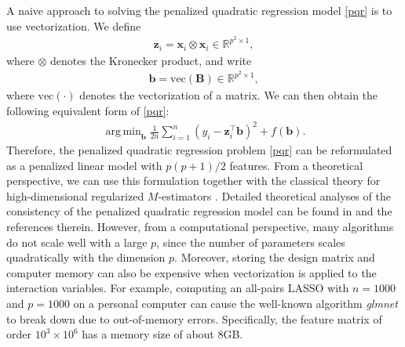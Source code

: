 \documentclass[preprint,authoryear,11pt]{elsarticle}
\def\mR{\mathbb{R}}
\def\wvec{\mbox{vec}}
\newcommand{\B}{\mathbf B}
\newcommand{\x}{\mathbf x}
\newcommand{\z}{\mathbf z}
\newcommand{\bb}{\mathbf b}
\newcommand{\trans}{^\top}
\DeclareMathOperator*{\argmin}{arg\,min} %
\begin{document}
 


A naive approach to solving the penalized quadratic regression model \eqref{pqr} is to use vectorization. We define
\begin{align*}
	\z_i=\x_i \otimes \x_i \in \mR^{p^2 \times 1},
\end{align*}
where \(\otimes\) denotes the Kronecker product, and write 
\begin{align*}
	\bb=\wvec(\B) \in \mR^{p^2 \times 1},
\end{align*}
where $\wvec(\cdot)$ denotes the vectorization of a matrix. We can then obtain  the following equivalent form of \eqref{pqr}:
\begin{align*}
\argmin_{ \bb } \frac{1}{2n} \sum_{i=1}^n (y_i-\z_i\trans \bb)^2+f(\bb).
\end{align*}
Therefore, the penalized quadratic regression problem \eqref{pqr} can be reformulated as a penalized linear model with $p(p+1)/2$ features. From a theoretical perspective, we can use this formulation together with the classical theory for high-dimensional regularized $M$-estimators \citep[Chapter 9]{wainwright2019high}. Detailed theoretical analyses of the consistency of the penalized quadratic regression model can be found in \cite{zhao2016analysis} and the references therein.
However, from a computational perspective, many algorithms do not scale well with a large $p$, since the number of parameters scales quadratically with the dimension $p$. Moreover, storing the design matrix and computer memory can also be expensive when vectorization is applied to the interaction variables. For example, computing an all-pairs LASSO with $n=1000$ and $p=1000$ on a personal computer can cause the well-known algorithm \textit{glmnet} \citep{glmnet} to break down due to out-of-memory errors. Specifically, the feature matrix of order $10^3 \times 10^6$ has a memory size of about 8GB.
\end{document}
